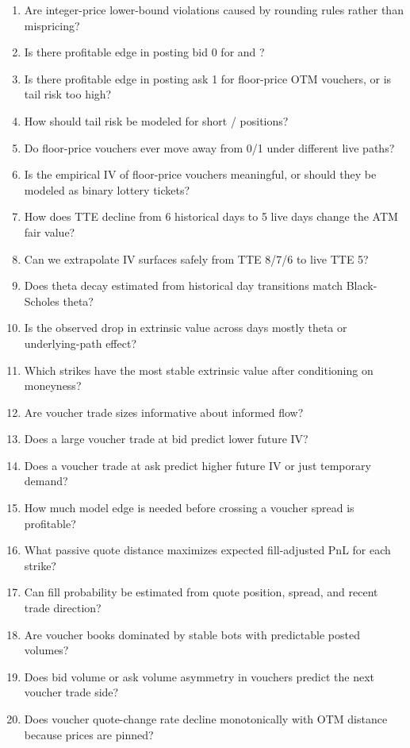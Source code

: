 \documentclass[11pt]{article}
\newcommand{\code}[1]{\texttt{\detokenize{#1}}}
\begin{document}
\begin{enumerate}[label=Q\arabic*.,leftmargin=*]
  \item Are integer-price lower-bound violations caused by rounding rules rather than mispricing?
  \item Is there profitable edge in posting bid 0 for \code{VEV_6000} and \code{VEV_6500}?
  \item Is there profitable edge in posting ask 1 for floor-price OTM vouchers, or is tail risk too high?
  \item How should tail risk be modeled for short \code{VEV_6000}/\code{VEV_6500} positions?
  \item Do floor-price vouchers ever move away from 0/1 under different live paths?
  \item Is the empirical IV of floor-price vouchers meaningful, or should they be modeled as binary lottery tickets?
  \item How does TTE decline from 6 historical days to 5 live days change the ATM fair value?
  \item Can we extrapolate IV surfaces safely from TTE 8/7/6 to live TTE 5?
  \item Does theta decay estimated from historical day transitions match Black-Scholes theta?
  \item Is the observed drop in extrinsic value across days mostly theta or underlying-path effect?
  \item Which strikes have the most stable extrinsic value after conditioning on moneyness?
  \item Are voucher trade sizes informative about informed flow?
  \item Does a large voucher trade at bid predict lower future IV?
  \item Does a voucher trade at ask predict higher future IV or just temporary demand?
  \item How much model edge is needed before crossing a voucher spread is profitable?
  \item What passive quote distance maximizes expected fill-adjusted PnL for each strike?
  \item Can fill probability be estimated from quote position, spread, and recent trade direction?
  \item Are voucher books dominated by stable bots with predictable posted volumes?
  \item Does bid volume or ask volume asymmetry in vouchers predict the next voucher trade side?
  \item Does voucher quote-change rate decline monotonically with OTM distance because prices are pinned?

\end{enumerate}
\end{document}
